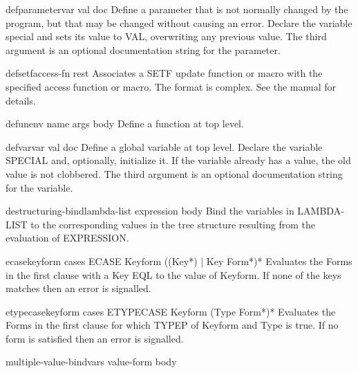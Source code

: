 \begin{macro}{defparameter}{var val \op doc}{}{}
  Define a parameter that is not normally changed by the program,
  but that may be changed without causing an error. Declare the
  variable special and sets its value to VAL, overwriting any
  previous value. The third argument is an optional documentation
  string for the parameter.
\end{macro}

\begin{macro}{defsetf}{access-fn \rest rest}{}{}
  Associates a SETF update function or macro with the specified access
  function or macro. The format is complex. See the manual for details.
\end{macro}

\begin{macro}{defun}{\env env name args \body body}{}{}
  Define a function at top level.
\end{macro}

\begin{macro}{defvar}{var \op val doc}{}{}
  Define a global variable at top level. Declare the variable
  SPECIAL and, optionally, initialize it. If the variable already has a
  value, the old value is not clobbered. The third argument is an optional
  documentation string for the variable.
\end{macro}

\begin{macro}{destructuring-bind}{lambda-list expression \body body}{}{}
  Bind the variables in LAMBDA-LIST to the corresponding values in the
tree structure resulting from the evaluation of EXPRESSION.
\end{macro}

\begin{macro}{ecase}{keyform \body cases}{}{}
  ECASE Keyform {({(Key*) | Key} Form*)}*
  Evaluates the Forms in the first clause with a Key EQL to the value of
  Keyform. If none of the keys matches then an error is signalled.
\end{macro}

\begin{macro}{etypecase}{keyform \body cases}{}{}
  ETYPECASE Keyform {(Type Form*)}*
  Evaluates the Forms in the first clause for which TYPEP of Keyform and Type
  is true. If no form is satisfied then an error is signalled.
\end{macro}

\begin{macro}{multiple-value-bind}{vars value-form \body body}{}{}
  
\end{macro}

